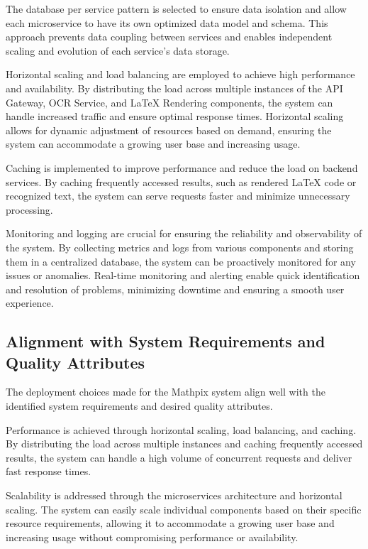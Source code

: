 \documentclass{article}
\begin{document}
The database per service pattern is selected to ensure data isolation and allow each microservice to have its own optimized data model and schema. This approach prevents data coupling between services and enables independent scaling and evolution of each service's data storage.

Horizontal scaling and load balancing are employed to achieve high performance and availability. By distributing the load across multiple instances of the API Gateway, OCR Service, and LaTeX Rendering components, the system can handle increased traffic and ensure optimal response times. Horizontal scaling allows for dynamic adjustment of resources based on demand, ensuring the system can accommodate a growing user base and increasing usage.

Caching is implemented to improve performance and reduce the load on backend services. By caching frequently accessed results, such as rendered LaTeX code or recognized text, the system can serve requests faster and minimize unnecessary processing.

Monitoring and logging are crucial for ensuring the reliability and observability of the system. By collecting metrics and logs from various components and storing them in a centralized database, the system can be proactively monitored for any issues or anomalies. Real-time monitoring and alerting enable quick identification and resolution of problems, minimizing downtime and ensuring a smooth user experience.

\subsection{Alignment with System Requirements and Quality Attributes}
The deployment choices made for the Mathpix system align well with the identified system requirements and desired quality attributes.

Performance is achieved through horizontal scaling, load balancing, and caching. By distributing the load across multiple instances and caching frequently accessed results, the system can handle a high volume of concurrent requests and deliver fast response times.

Scalability is addressed through the microservices architecture and horizontal scaling. The system can easily scale individual components based on their specific resource requirements, allowing it to accommodate a growing user base and increasing usage without compromising performance or availability.
\end{document}
